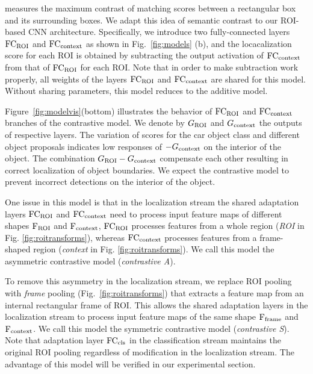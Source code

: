 \documentclass[runningheads]{llncs}
\begin{document}
measures the maximum contrast of matching scores between a rectangular box and
its surrounding boxes. We adapt this idea of semantic contrast to our ROI-based
CNN architecture. Specifically, we introduce two fully-connected layers ${\rm FC_{ROI}}$ and ${\rm FC_{context}}$ as shown in Fig.~\ref{fig:models} (b), and the locacalization score for each ROI is obtained by subtracting the output activation of ${\rm FC_{context}}$ from that of ${\rm FC_{ROI}}$ for each ROI.
Note that in order to make subtraction work properly, all weights of the layers ${\rm
FC_{ROI}}$ and ${\rm FC_{context}}$ are shared for this model. Without sharing parameters, this model reduces to the additive model.  %

Figure~\ref{fig:modelvis}(bottom) illustrates the behavior of ${\rm FC_{ROI}}$ and ${\rm FC_{context}}$
branches of the contrastive model. We denote by $G_{\rm ROI}$ and $G_{\rm context}$ the outputs of respective layers. The variation of scores for the car object
class and different object proposals indicates low responses of $-G_{\rm context}$
on the interior of the object. The combination $G_{\rm ROI}-G_{\rm context}$ compensate each other
resulting in correct localization of object boundaries. We expect the
contrastive model to prevent incorrect detections on the interior of the object.

One issue in this model is that in the localization stream the shared adaptation layers ${\rm FC_{ROI}}$ and ${\rm FC_{context}}$ need to process input feature maps of different shapes ${\rm F_{ROI}}$ and ${\rm F_{context}}$, \ie${\rm FC_{ROI}}$ processes features from a whole region ({\em ROI} in Fig. \ref{fig:roitransforms}), whereas ${\rm FC_{context}}$ processes features from a frame-shaped region ({\em context} in Fig. \ref{fig:roitransforms}). We call this model the asymmetric contrastive model ({\em contrastive A}).  

To remove this asymmetry in the localization stream, we replace ROI pooling with {\em frame} pooling (Fig.~\ref{fig:roitransforms}) that extracts a feature map from an internal rectangular frame of ROI. This allows the shared adaptation layers in the localization stream to process input feature maps of the same shape ${\rm F_{frame}}$ and ${\rm F_{context}}$. We call this model the symmetric contrastive model ({\em contrastive S}). Note that adaptation layer ${\rm
FC_{cls}}$ in the classification stream maintains the original ROI pooling 
regardless of modification in the localization stream. The advantage of this
model will be verified in our experimental section.  
\end{document}
